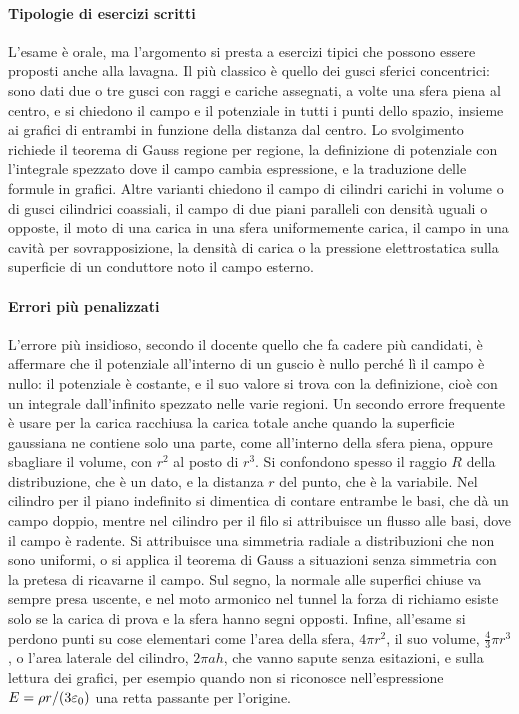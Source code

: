 \documentclass[11pt,a4paper]{article}
\begin{document}
\paragraph*{Tipologie di esercizi scritti}
L'esame è orale, ma l'argomento si presta a esercizi tipici che possono essere proposti anche alla lavagna. Il più classico è quello dei gusci sferici concentrici: sono dati due o tre gusci con raggi e cariche assegnati, a volte una sfera piena al centro, e si chiedono il campo e il potenziale in tutti i punti dello spazio, insieme ai grafici di entrambi in funzione della distanza dal centro. Lo svolgimento richiede il teorema di Gauss regione per regione, la definizione di potenziale con l'integrale spezzato dove il campo cambia espressione, e la traduzione delle formule in grafici. Altre varianti chiedono il campo di cilindri carichi in volume o di gusci cilindrici coassiali, il campo di due piani paralleli con densità uguali o opposte, il moto di una carica in una sfera uniformemente carica, il campo in una cavità per sovrapposizione, la densità di carica o la pressione elettrostatica sulla superficie di un conduttore noto il campo esterno.

\paragraph*{Errori più penalizzati}
L'errore più insidioso, secondo il docente quello che fa cadere più candidati, è affermare che il potenziale all'interno di un guscio è nullo perché lì il campo è nullo: il potenziale è costante, e il suo valore si trova con la definizione, cioè con un integrale dall'infinito spezzato nelle varie regioni. Un secondo errore frequente è usare per la carica racchiusa la carica totale anche quando la superficie gaussiana ne contiene solo una parte, come all'interno della sfera piena, oppure sbagliare il volume, con $r^2$ al posto di $r^3$. Si confondono spesso il raggio $R$ della distribuzione, che è un dato, e la distanza $r$ del punto, che è la variabile. Nel cilindro per il piano indefinito si dimentica di contare entrambe le basi, che dà un campo doppio, mentre nel cilindro per il filo si attribuisce un flusso alle basi, dove il campo è radente. Si attribuisce una simmetria radiale a distribuzioni che non sono uniformi, o si applica il teorema di Gauss a situazioni senza simmetria con la pretesa di ricavarne il campo. Sul segno, la normale alle superfici chiuse va sempre presa uscente, e nel moto armonico nel tunnel la forza di richiamo esiste solo se la carica di prova e la sfera hanno segni opposti. Infine, all'esame si perdono punti su cose elementari come l'area della sfera, $4\pi r^2$, il suo volume, $\tfrac43\pi r^3$, o l'area laterale del cilindro, $2\pi a h$, che vanno sapute senza esitazioni, e sulla lettura dei grafici, per esempio quando non si riconosce nell'espressione $E=\rho r/(3\varepsilon_0)$ una retta passante per l'origine.
\end{document}
